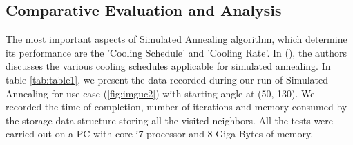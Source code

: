 \subsection{Comparative Evaluation and Analysis}
The most important aspects of Simulated Annealing algorithm, which determine its performance are the 'Cooling Schedule' and 'Cooling Rate'. In (\cite{nourani1998comparison}), the authors discusses the various cooling schedules applicable for simulated annealing. In table \ref{tab:table1}, we present the data recorded during our run of Simulated Annealing for use case (\ref{fig:imguc2}) with starting angle at (50,-130). We recorded the time of completion, number of iterations and memory consumed by the storage data structure storing all the visited neighbors. All the tests were carried out on a PC with core i7 processor and 8 Giga Bytes of memory. 

